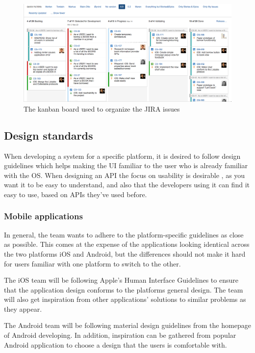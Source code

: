 \begin{figure}
    \includegraphics[width=\textwidth,keepaspectratio,origin=c]{figs/kanban-illustration.png}
    \caption{The kanban board used to organize the JIRA issues}
    \label{fig:kanban-illustration}
\end{figure}

\subsection{Design standards}
When developing a system for a specific platform, it is desired to follow design guidelines which helps making the \gls{UI} familiar to the user who is already familiar with the \gls{OS}. When designing an \gls{API} the focus on usability is desirable , as you want it to be easy to understand, and also that the developers using it can find it easy to use, based on \gls{API}s they've used before. 

\subsubsection{Mobile applications}
In general, the team wants to adhere to the platform-specific guidelines as close as possible. This comes at the expense of the applications looking identical across the two platforms iOS and Android, but the differences should not make it hard for users familiar with one platform to switch to the other.  

The iOS team will be following Apple's Human Interface Guidelines to ensure that the application design conforms to the platforms general design.\cite{human-interface-guidelines} The team will also get inspiration from other applications' solutions to similar problems as they appear.

The Android team will be following material design guidelines from the homepage of Android developing.\cite{android-design} In addition, inspiration can be gathered from popular Android application to choose a design that the users is comfortable with.

